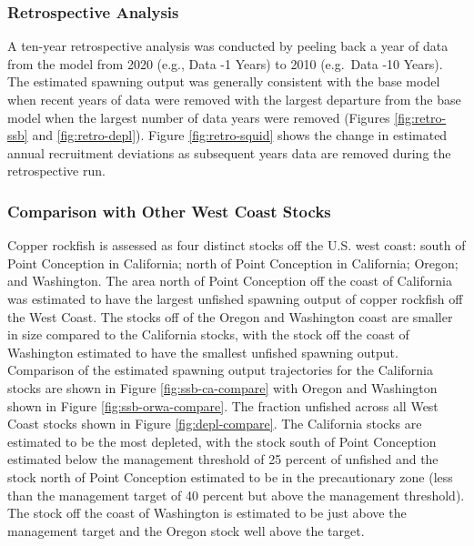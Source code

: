 \documentclass[11pt,
  english,
  a4paper,
]{article}
\begin{document}
\leavevmode\tagmcend\tagstructend\par


\hypertarget{retrospective-analysis}{%
\subsubsection{Retrospective Analysis}\label{retrospective-analysis}}

\leavevmode\tagmcend\tagstructend


A ten-year retrospective analysis was conducted by peeling back a year of data from the model from 2020 (e.g., Data -1 Years) to 2010 (e.g.~Data -10 Years). The estimated spawning output was generally consistent with the base model when recent years of data were removed with the largest departure from the base model when the largest number of data years were removed (Figures \ref{fig:retro-ssb} and \ref{fig:retro-depl}). Figure \ref{fig:retro-squid} shows the change in estimated annual recruitment deviations as subsequent years data are removed during the retrospective run.

\leavevmode\tagmcend\tagstructend\par


\hypertarget{comparison-with-other-west-coast-stocks}{%
\subsubsection{Comparison with Other West Coast Stocks}\label{comparison-with-other-west-coast-stocks}}

\leavevmode\tagmcend\tagstructend


Copper rockfish is assessed as four distinct stocks off the U.S. west coast: south of Point Conception in California; north of Point Conception in California; Oregon; and Washington. The area north of Point Conception off the coast of California was estimated to have the largest unfished spawning output of copper rockfish off the West Coast. The stocks off of the Oregon and Washington coast are smaller in size compared to the California stocks, with the stock off the coast of Washington estimated to have the smallest unfished spawning output. Comparison of the estimated spawning output trajectories for the California stocks are shown in Figure \ref{fig:ssb-ca-compare} with Oregon and Washington shown in Figure \ref{fig:ssb-orwa-compare}. The fraction unfished across all West Coast stocks shown in Figure \ref{fig:depl-compare}. The California stocks are estimated to be the most depleted, with the stock south of Point Conception estimated below the management threshold of 25 percent of unfished and the stock north of Point Conception estimated to be in the precautionary zone (less than the management target of 40 percent but above the management threshold). The stock off the coast of Washington is estimated to be just above the management target and the Oregon stock well above the target.
\end{document}
